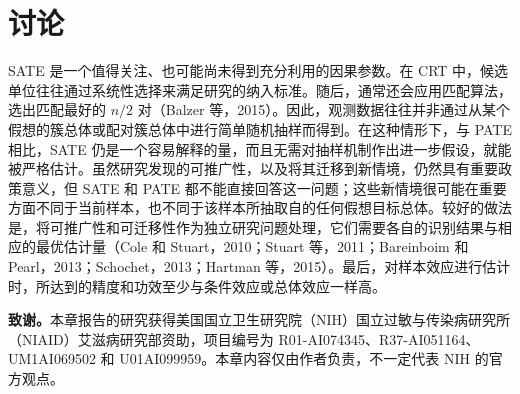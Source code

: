 \section{讨论}

SATE 是一个值得关注、也可能尚未得到充分利用的因果参数。在 CRT 中，候选单位往往通过系统性选择来满足研究的纳入标准。随后，通常还会应用匹配算法，选出匹配最好的 $n/2$ 对（Balzer 等，2015）。因此，观测数据往往并非通过从某个假想的簇总体或配对簇总体中进行简单随机抽样而得到。在这种情形下，与 PATE 相比，SATE 仍是一个容易解释的量，而且无需对抽样机制作出进一步假设，就能被严格估计。虽然研究发现的可推广性，以及将其迁移到新情境，仍然具有重要政策意义，但 SATE 和 PATE 都不能直接回答这一问题；这些新情境很可能在重要方面不同于当前样本，也不同于该样本所抽取自的任何假想目标总体。较好的做法是，将可推广性和可迁移性作为独立研究问题处理，它们需要各自的识别结果与相应的最优估计量（Cole 和 Stuart，2010；Stuart 等，2011；Bareinboim 和 Pearl，2013；Schochet，2013；Hartman 等，2015）。最后，对样本效应进行估计时，所达到的精度和功效至少与条件效应或总体效应一样高。

\noindent\textbf{致谢。}本章报告的研究获得美国国立卫生研究院（NIH）国立过敏与传染病研究所（NIAID）艾滋病研究部资助，项目编号为 R01-AI074345、R37-AI051164、UM1AI069502 和 U01AI099959。本章内容仅由作者负责，不一定代表 NIH 的官方观点。
\clearpage
\endgroup
